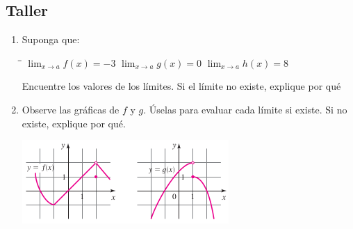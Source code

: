 \documentclass[10pt,twoside]{article}
\begin{document}
\subsection*{Taller}
\begin{enumerate}
\item Suponga que:
\begin{tabbing}
\hspace{3cm}\=\hspace{3cm}\=\kill
$\displaystyle{\lim_{x\rightarrow a}}f(x)=-3$ \> $\displaystyle{\lim_{x\rightarrow a}}g(x)=0$ \> $\displaystyle{\lim_{x\rightarrow a}}h(x)=8$
\end{tabbing} 
Encuentre los valores de los l\'{i}mites. Si el l\'{i}mite no existe, explique por qu\'{e}
\begin{enumerate}
\end{enumerate}
\item Observe las gráficas de $f$ y $g$. Úselas para evaluar cada límite si existe. Si no existe, explique por qué.
\begin{center}
\includegraphics[scale=.8]{Images/funciones_fyg.png} 
\end{center}
\begin{enumerate}
\end{enumerate}
\end{enumerate}
\end{document}
